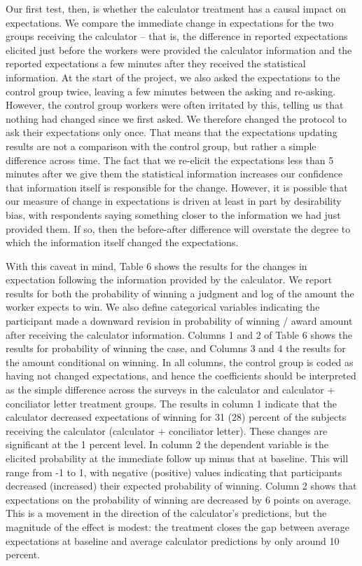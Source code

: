 \documentclass[oneside,12pt]{article}
\begin{document}
Our first test, then, is whether the calculator treatment has a causal impact on expectations. We compare the immediate change in expectations for the two groups receiving the calculator – that is, the difference in reported expectations elicited just before the workers were provided the calculator information and the reported expectations a few minutes after they received the statistical information. At the start of the project, we also asked the expectations to the control group twice, leaving a few minutes between the asking and re-asking. However, the control group workers were often irritated by this, telling us that nothing had changed since we first asked. We therefore changed the protocol to ask their expectations only once. That means that the expectations updating results are not a comparison with the control group, but rather a simple difference across time. The fact that we re-elicit the expectations less than 5 minutes after we give them the statistical information increases our confidence that information itself is responsible for the change. However, it is possible that our measure of change in expectations is driven at least in part by desirability bias, with respondents saying something closer to the information we had just provided them. If so, then the before-after difference will overstate the degree to which the information itself changed the expectations. 

With this caveat in mind, Table 6 shows the results for the changes in expectation following the information provided by the calculator. We report results for both the probability of winning a judgment and log of the amount the worker expects to win. We also define categorical variables indicating the participant made a downward revision in probability of winning / award amount after receiving the calculator information. Columns 1 and 2 of Table 6 shows the results for probability of winning the case, and Columns 3 and 4 the results for the amount conditional on winning. In all columns, the control group is coded as having not changed expectations, and hence the coefficients should be interpreted as the simple difference across the surveys in the calculator and calculator + conciliator letter treatment groups. The results in column 1 indicate that the calculator decreased expectations of winning for 31 (28) percent of the subjects receiving the calculator (calculator + conciliator letter). These changes are significant at the 1 percent level. In column 2 the dependent variable is the elicited probability at the immediate follow up minus that at baseline. This will range from -1 to 1, with negative (positive) values indicating that participants decreased (increased) their expected probability of winning. Column 2 shows that expectations on the probability of winning are decreased by 6 points on average. This is a movement in the direction of the calculator’s predictions, but the magnitude of the effect is modest: the treatment closes the gap between average expectations at baseline and average calculator predictions by only around 10 percent. 
\end{document}

